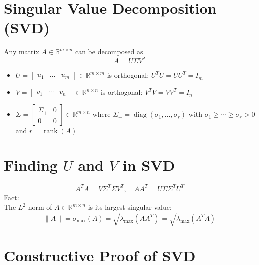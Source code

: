 \documentclass[10pt,a4paper,oneside]{article}
\begin{document}
\section{Singular Value Decomposition (SVD)}
Any matrix $A \in \mathbb{R}^{m \times n}$ can be decomposed as
\[
A=U \Sigma V^{T}
\]
\begin{itemize}
\item $U=\left[\begin{array}{lll}{u_{1}} & {\dots} & {u_{m}}\end{array}\right] \in \mathbb{R}^{m \times m}$ is orthogonal: $U^{T} U=U U^{T}=I_{m}$
\item $V=\left[\begin{array}{lll}{v_{1}} & {\cdots} & {v_{n}}\end{array}\right] \in \mathbb{R}^{n \times n}$ is orthogonal: $V^{T} V=V V^{T}=I_{n}$
\item $\Sigma=\left[\begin{array}{cc}{\Sigma_{+}} & {0} \\ {0} & {0}\end{array}\right] \in \mathbb{R}^{m \times n}$ where $\Sigma_{+}=\operatorname{diag}\left(\sigma_{1}, \ldots, \sigma_{r}\right)$ with $\sigma_{1} \geq \cdots \geq \sigma_{r}>0$ and ${r}=\operatorname{rank}(A)$
\end{itemize}
\section{Finding $U$ and $V$ in SVD}
\[
{A^{T} A}=V \Sigma^{T} \Sigma V^{T}, \quad A A^{T}=U \Sigma \Sigma^{T} U^{T}
\]
Fact:\\
The $L^{2}$ norm of $A \in \mathbb{R}^{m \times n}$ is its largest singular value:
\[
\|A\|=\sigma_{\max }(A)=\sqrt{\lambda_{\max }\left(A A^{T}\right)}=\sqrt{\lambda_{\max }\left(A^{T} A\right)}
\]
\section{Constructive Proof of SVD}
\end{document}
